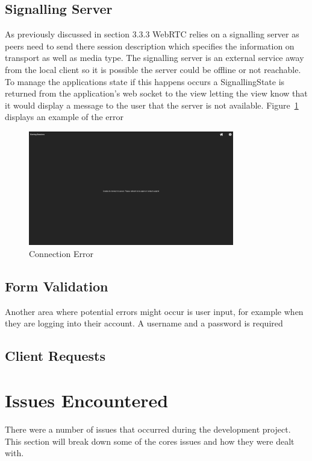 \subsection{Signalling Server}
As previously discussed in section 3.3.3 WebRTC relies on a signalling server as peers need to send there session description which specifies the information on transport as well as media type. The signalling server is an external service away from the local client so it is possible the server could be offline or not reachable. To manage the applications state if this happens occurs
a SignallingState is returned from the application's web socket to the view letting the view know that it would display a message to the user that the server is not available. Figure~\ref{image:connectionError} displays an example of the error


\begin{figure}[h!]
    \caption{Connection Error}
    \label{image:connectionError}
    \centering
    \includegraphics[width=0.8\textwidth]{images/screenshotsOfPages/connectionError.png}
\end{figure}
         
\subsection{Form Validation}
Another area where potential errors might occur is user input, for example when they are logging into their account. A username and a password is required 

\subsection{Client Requests}



\section{Issues Encountered}
There were a number of issues that occurred during the development project. This section will break down some of the cores issues and how they were dealt with. 

